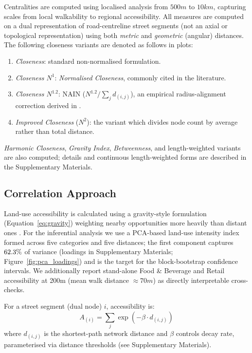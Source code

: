 Centralities are computed using localised analysis from $500m$ to $10km$, capturing scales from local walkability to regional accessibility. All measures are computed on a dual representation of road-centreline street segments (not an axial or topological representation) using both \emph{metric} and \emph{geometric} (angular) distances. The following closeness variants are denoted as follows in plots:
\begin{enumerate}
  \item \emph{Closeness}: standard non-normalised formulation.
  \item \emph{Closeness $N^{1}$}: \emph{Normalised Closeness}, commonly cited in the literature.
  \item \emph{Closeness $N^{1.2}$}: NAIN ($N^{1.2}/\sum_{j}d_{(i,j)}$), an empirical radius-alignment correction derived in \citet{Hillier2012}.
  \item \emph{Improved Closeness} ($N^{2}$): the variant which divides node count by average rather than total distance.
\end{enumerate}
\emph{Harmonic Closeness}, \emph{Gravity Index}, \emph{Betweenness}, and length-weighted variants are also computed; details and continuous length-weighted forms are described in the Supplementary Materials.

\subsection{Correlation Approach}

Land-use accessibility is calculated using a gravity-style formulation (Equation~\ref{eq:gravity}) weighting nearby opportunities more heavily than distant ones \cite{Sevtsuk2012, Iacono2008}. For the inferential analysis we use a PCA-based land-use intensity index formed across five categories and five distances; the first component captures $62.3\%$ of variance (loadings in Supplementary Materials; Figure~\ref{fig:pca_loadings}) and is the target for the block-bootstrap confidence intervals. We additionally report stand-alone Food \& Beverage and Retail accessibility at 200m (mean walk distance ${\approx}70m$) as directly interpretable cross-checks.

For a street segment (dual node) $i$, accessibility is:
\begin{equation}\label{eq:gravity}
  A_{(i)}=\sum_{j}\exp(-\beta\cdot d_{(i,j)})
\end{equation}
where $d_{(i,j)}$ is the shortest-path network distance and $\beta$ controls decay rate, parameterised via distance thresholds (see Supplementary Materials).

